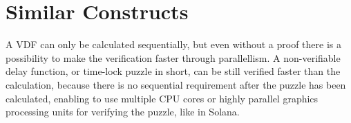 \section{Similar Constructs}
A VDF can only be calculated sequentially, but even without a proof there is a possibility to make the verification faster through parallellism. A non-verifiable delay function, or time-lock puzzle in short, can be still verified faster than the calculation, because there is no sequential requirement after the puzzle has been calculated, enabling to use multiple CPU cores or highly parallel graphics processing units for verifying the puzzle, like in Solana.\cite{yakovenko_solana_2018} 

